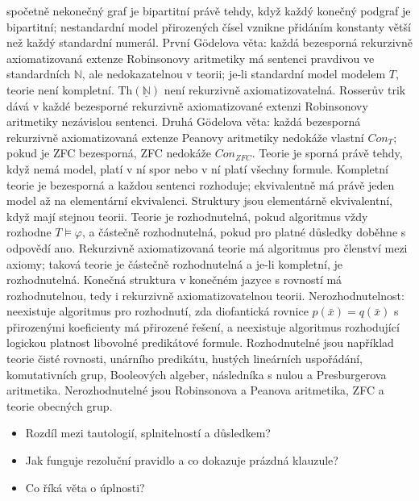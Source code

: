 \begin{odpoved}
spočetně nekonečný graf je bipartitní právě tehdy, když každý konečný podgraf je bipartitní;
nestandardní model přirozených čísel vznikne přidáním konstanty větší než každý standardní
numerál. První Gödelova věta: každá bezesporná rekurzivně axiomatizovaná extenze Robinsonovy
aritmetiky má sentenci pravdivou ve standardních $\mathbb N$, ale nedokazatelnou v teorii;
je-li standardní model modelem $T$, teorie není kompletní. $\mathrm{Th}(\underline{\mathbb N})$
není rekurzivně axiomatizovatelná. Rosserův trik dává v každé bezesporné rekurzivně
axiomatizované extenzi Robinsonovy aritmetiky nezávislou sentenci. Druhá Gödelova věta:
každá bezesporná rekurzivně axiomatizovaná extenze Peanovy aritmetiky nedokáže vlastní
$\mathit{Con}_T$; pokud je ZFC bezesporná, ZFC nedokáže $\mathit{Con}_{ZFC}$. Teorie je
sporná právě tehdy, když nemá model, platí v ní spor nebo v ní platí všechny formule.
Kompletní teorie je bezesporná a každou sentenci rozhoduje; ekvivalentně má právě jeden
model až na elementární ekvivalenci. Struktury jsou elementárně ekvivalentní, když mají
stejnou teorii. Teorie je rozhodnutelná, pokud algoritmus vždy rozhodne $T\models\varphi$,
a částečně rozhodnutelná, pokud pro platné důsledky doběhne s odpovědí ano. Rekurzivně
axiomatizovaná teorie má algoritmus pro členství mezi axiomy; taková teorie je částečně
rozhodnutelná a je-li kompletní, je rozhodnutelná. Konečná struktura v konečném jazyce
s rovností má rozhodnutelnou, tedy i rekurzivně axiomatizovatelnou teorii. Nerozhodnutelnost: neexistuje
algoritmus pro rozhodnutí, zda diofantická rovnice $p(\bar x)=q(\bar x)$ s přirozenými
koeficienty má přirozené řešení, a neexistuje algoritmus rozhodující logickou platnost
libovolné predikátové formule. Rozhodnutelné jsou například teorie čisté rovnosti,
unárního predikátu, hustých lineárních uspořádání, komutativních grup, Booleových algeber,
následníka s nulou a Presburgerova aritmetika. Nerozhodnutelné jsou Robinsonova a Peanova
aritmetika, ZFC a teorie obecných grup.
\end{odpoved}
\begin{recall}
\begin{itemize}[leftmargin=1.2em,itemsep=0pt,topsep=1pt]
  \item Rozdíl mezi tautologií, splnitelností a důsledkem?
  \item Jak funguje rezoluční pravidlo a co dokazuje prázdná klauzule?
  \item Co říká věta o úplnosti?
\end{itemize}
\end{recall}
